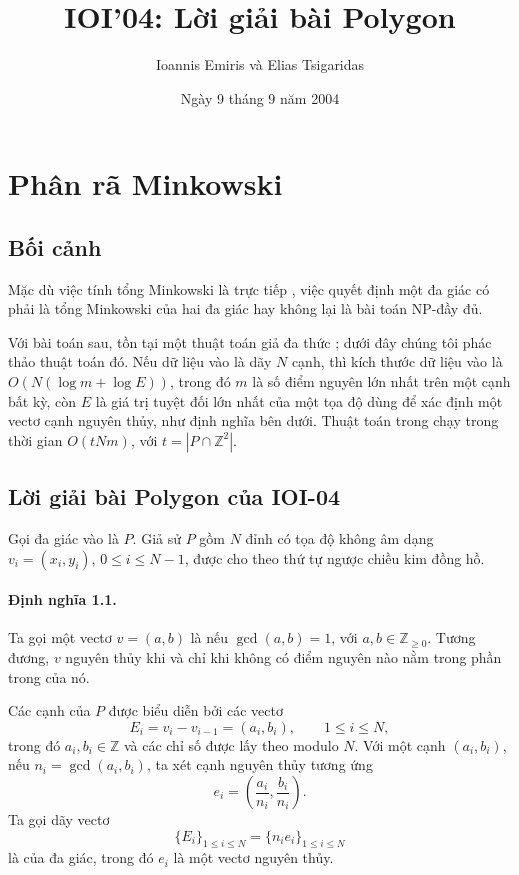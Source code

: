 \documentclass[11pt]{article}
\title{IOI'04: Lời giải bài Polygon}
\author{Ioannis Emiris và Elias Tsigaridas}
\date{Ngày 9 tháng 9 năm 2004}
\begin{document}
\maketitle


\section{Phân rã Minkowski}

\subsection{Bối cảnh}

Mặc dù việc tính tổng Minkowski là trực tiếp \cite{guibas-seidel}, việc quyết
định một đa giác có phải là tổng Minkowski của hai đa giác hay không lại là
bài toán NP-đầy đủ.

Với bài toán sau, tồn tại một thuật toán giả đa thức \cite{gao-lauder}; dưới
đây chúng tôi phác thảo thuật toán đó. Nếu dữ liệu vào là dãy \(N\) cạnh, thì
kích thước dữ liệu vào là \(O(N(\log m+\log E))\), trong đó \(m\) là số điểm
nguyên lớn nhất trên một cạnh bất kỳ, còn \(E\) là giá trị tuyệt đối lớn nhất
của một tọa độ dùng để xác định một vectơ cạnh nguyên thủy, như định nghĩa bên
dưới. Thuật toán trong \cite{gao-lauder} chạy trong thời gian
\(O(tNm)\), với \(t=|P\cap\mathbb Z^2|\).

\subsection{Lời giải bài Polygon của IOI-04}

Gọi đa giác vào là \(P\). Giả sử \(P\) gồm \(N\) đỉnh có tọa độ không âm dạng
\(v_i=(x_i,y_i)\), \(0\le i\le N-1\), được cho theo thứ tự ngược chiều kim
đồng hồ.

\paragraph{Định nghĩa 1.1.}
Ta gọi một vectơ \(v=(a,b)\) là  nếu
\(\gcd(a,b)=1\), với \(a,b\in\mathbb Z_{\ge 0}\). Tương đương, \(v\) nguyên
thủy khi và chỉ khi không có điểm nguyên nào nằm trong phần trong của nó.

Các cạnh của \(P\) được biểu diễn bởi các vectơ
\[
  E_i=v_i-v_{i-1}=(a_i,b_i),\qquad 1\le i\le N,
\]
trong đó \(a_i,b_i\in\mathbb Z\) và các chỉ số được lấy theo modulo \(N\).
Với một cạnh \((a_i,b_i)\), nếu \(n_i=\gcd(a_i,b_i)\), ta xét cạnh nguyên thủy
tương ứng
\[
  e_i=\left(\frac{a_i}{n_i},\frac{b_i}{n_i}\right).
\]
Ta gọi dãy vectơ
\[
  \{E_i\}_{1\le i\le N}=\{n_i e_i\}_{1\le i\le N}
\]
là  của đa giác, trong đó \(e_i\) là một vectơ nguyên thủy.
\end{document}
